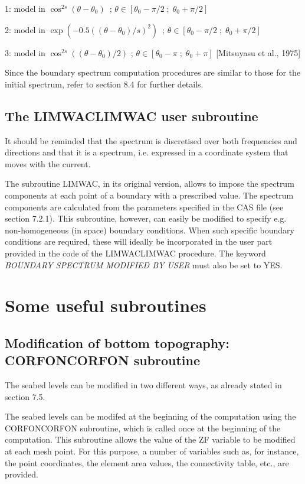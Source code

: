  1:  model in $\cos ^{2s} (\theta -\theta _{0} )$~; $\theta \in \left[\theta _{0} -\pi /2\; ;\; \theta _{0} +\pi /2\right]$

 2:  model in $\exp \left(-0.5\left(\left(\theta -\theta _{0} \right)/s\right)^{2} \right)$~; $\theta \in \left[\theta _{0} -\pi /2\; ;\; \theta _{0} +\pi /2\right]$

 3:  model in $\cos ^{2s} \left(\left(\theta -\theta _{0} \right)/2\right)$ ; $\theta \in \left[\theta _{0} -\pi \; ;\; \theta _{0} +\pi \right]$ [Mitsuyasu et al., 1975]

 Since the boundary spectrum computation procedures are similar to those for the initial spectrum, refer to section 8.4 for further details.


\subsection{ The LIMWACLIMWAC user subroutine}

 It should be reminded that the spectrum is discretised over both frequencies and directions and that it is a  spectrum, i.e. expressed in a coordinate system that moves with the current.

 The subroutine LIMWAC, in its original version, allows to impose the spectrum components at each point of a boundary with a prescribed value. The spectrum components are calculated from the parameters specified in the CAS file (see section 7.2.1). This subroutine, however, can easily be modified to specify e.g. non-homogeneous (in space) boundary conditions. When such specific boundary conditions are required, these will ideally be incorporated in the user part provided in the code of the LIMWACLIMWAC procedure. The keyword \textit{BOUNDARY SPECTRUM MODIFIED BY USER} must also be set to YES.


\section{ Some useful subroutines}


\subsection{ Modification of bottom topography: CORFONCORFON subroutine}

 The seabed levels can be modified in two different ways, as already stated in section 7.5.

 The seabed levels can be modifed at the beginning of the computation using the CORFONCORFON subroutine, which is called once at the beginning of the computation. This subroutine allows the value of the ZF variable to be modified at each mesh point. For this purpose, a number of variables such as, for instance, the point coordinates, the element area values, the connectivity table, etc., are provided.

